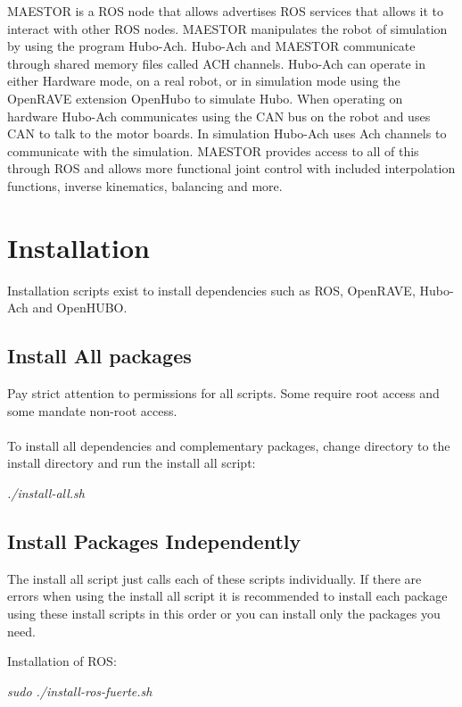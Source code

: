 \documentclass[12pt]{article}
\begin{document}
\noindent
MAESTOR is a ROS node that allows advertises ROS services that allows it to interact with other ROS nodes. MAESTOR manipulates the robot of simulation by using the program Hubo-Ach. Hubo-Ach and MAESTOR communicate through shared memory files called ACH channels. Hubo-Ach can operate in either Hardware mode, on a real robot, or in simulation mode using the OpenRAVE extension OpenHubo to simulate Hubo. When operating on hardware Hubo-Ach communicates using the CAN bus on the robot and uses CAN to talk to the motor boards. In simulation Hubo-Ach uses Ach channels to communicate with the simulation. MAESTOR provides access to all of this through ROS and allows more functional joint control with included interpolation functions, inverse kinematics, balancing and more. 

\section{Installation}

Installation scripts exist to install dependencies such as ROS, OpenRAVE, Hubo-Ach and OpenHUBO.

\subsection{Install All packages}
Pay strict attention to permissions for all scripts. Some require root access and some mandate non-root access.\\
\noindent
\\To install all dependencies and complementary packages, change directory to the install directory and run the install all script:
\begin{center}
\textit{./install-all.sh}
\end{center}
\pagebreak
\subsection{Install Packages Independently}

The install all script just calls each of these scripts individually. If there are errors when using the install all script it is recommended to install each package using these install scripts in this order or you can install only the packages you need.  

Installation of ROS:

\begin{center}
	\textit{sudo ./install-ros-fuerte.sh}
\end{center}
\end{document}
